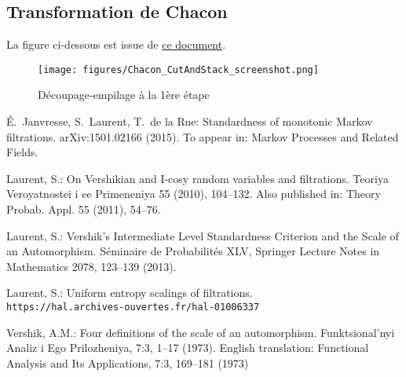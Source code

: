 \documentclass[12pt,a4paper]{article}
\begin{document}
\newpage 
\begin{appendices}

\section{Transformation de Chacon}\label{app:transfoChacon}

La figure ci-dessous est issue de \href{https://cdr.lib.unc.edu/indexablecontent/uuid:bfc41b0c-b048-440f-9a57-533e02ea4f76}{ce document}.  

\begin{figure}[!h]
\texttt{[image: figures/Chacon\_CutAndStack\_screenshot.png]} 
\caption{Découpage-empilage à la 1ère étape}
\end{figure}

\end{appendices}


\begin{thebibliography}{99.}

\'E.~Janvresse, S.~Laurent, T.~de la Rue: 
Standardness of monotonic Markov filtrations. 
	arXiv:1501.02166 (2015). 
To appear in: Markov Processes and Related Fields. 


 Laurent, S.: 
On Vershikian and I-cosy random variables and filtrations.
Teoriya Veroyatnostei i ee Primeneniya 55 (2010), 104--132. 
Also published in: Theory Probab. Appl. 55 (2011), 54--76.


Laurent, S.: 
Vershik's Intermediate Level Standardness Criterion and the Scale of an Automorphism. 
S\'eminaire de Probabilit\'es XLV,
Springer Lecture Notes in Mathematics 2078,
123--139 (2013).

Laurent, S.: 
Uniform entropy scalings of filtrations. \\
\verb+https://hal.archives-ouvertes.fr/hal-01006337+ 


Vershik, A.M.: 
Four definitions of the scale of an automorphism. 
Funktsional'nyi Analiz i Ego Prilozheniya, 7:3, 
1--17 (1973). 
English translation:    
Functional Analysis and Its Applications, 7:3, 169--181 (1973)



\end{thebibliography}
\end{document}
